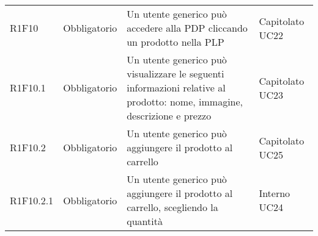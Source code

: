 {\begin{longtable}{C{2.5cm} C{2.8cm} C{6.7cm} C{2.5cm}}

R1F10 & Obbligatorio & Un utente generico può accedere alla PDP cliccando un prodotto nella PLP & Capitolato \newline UC22\\
R1F10.1 & Obbligatorio & Un utente generico può visualizzare le seguenti informazioni relative al prodotto: nome, immagine, descrizione e prezzo & Capitolato \newline UC23\\
R1F10.2 & Obbligatorio & Un utente generico può aggiungere il prodotto al carrello & Capitolato \newline UC25\\
R1F10.2.1 & Obbligatorio & Un utente generico può aggiungere il prodotto al carrello, scegliendo la quantità & Interno \newline UC24 \\

\end{longtable}

}